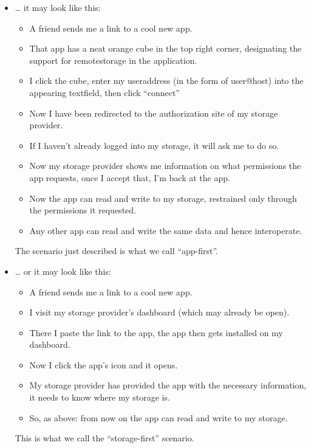 \documentclass[11pt]{article}
\begin{document}
\begin{itemize}

\item \ldots{} it may look like this:
\label{sec-1-3-1-1}%
\begin{itemize}
\item A friend sends me a link to a cool new app.
\item That app has a neat orange cube in the top right corner, designating the support for remotestorage in the application.
\item I click the cube, enter my useraddress (in the form of user@host) into the appearing textfield, then click ``connect''
\item Now I have been redirected to the authorization site of my storage provider.
\item If I haven't already logged into my storage, it will ask me to do so.
\item Now my storage provider shows me information on what permissions the app requests, once I accept that, I'm back at the app.
\item Now the app can read and write to my storage, restrained only through the permissions it requested.
\item Any other app can read and write the same data and hence interoperate.
\end{itemize}

     The scenario just described is what we call ``app-first''.


\item \ldots{} or it may look like this:
\label{sec-1-3-1-2}%
\begin{itemize}
\item A friend sends me a link to a cool new app.
\item I visit my storage provider's dashboard (which may already be open).
\item There I paste the link to the app, the app then gets installed on my dashboard.
\item Now I click the app's icon and it opens.
\item My storage provider has provided the app with the necessary information, it needs to know where my storage is.
\item So, as above: from now on the app can read and write to my storage.
\end{itemize}

     This is what we call the ``storage-first'' scenario.

\end{itemize} %
\end{document}
